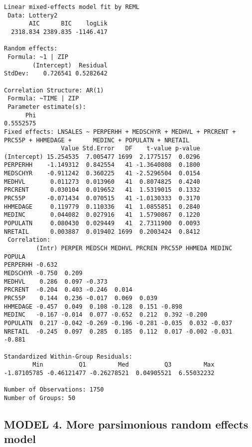 \documentclass[]{book}
\begin{document}
\begin{verbatim}
Linear mixed-effects model fit by REML
 Data: Lottery2 
       AIC      BIC    logLik
  2318.834 2389.835 -1146.417

Random effects:
 Formula: ~1 | ZIP
        (Intercept)  Residual
StdDev:    0.726541 0.5282642

Correlation Structure: AR(1)
 Formula: ~TIME | ZIP 
 Parameter estimate(s):
      Phi 
0.5552575 
Fixed effects: LNSALES ~ PERPERHH + MEDSCHYR + MEDHVL + PRCRENT + PRC55P + HHMEDAGE +      MEDINC + POPULATN + NRETAIL 
                Value Std.Error   DF    t-value p-value
(Intercept) 15.254535  7.005477 1699  2.1775157  0.0296
PERPERHH    -1.149312  0.842554   41 -1.3640808  0.1800
MEDSCHYR    -0.911242  0.360225   41 -2.5296504  0.0154
MEDHVL       0.011273  0.013960   41  0.8074825  0.4240
PRCRENT      0.030104  0.019652   41  1.5319015  0.1332
PRC55P      -0.071434  0.070515   41 -1.0130333  0.3170
HHMEDAGE     0.119779  0.110336   41  1.0855851  0.2840
MEDINC       0.044082  0.027916   41  1.5790867  0.1220
POPULATN     0.080430  0.029449   41  2.7311900  0.0093
NRETAIL      0.003887  0.019402 1699  0.2003424  0.8412
 Correlation: 
         (Intr) PERPER MEDSCH MEDHVL PRCREN PRC55P HHMEDA MEDINC POPULA
PERPERHH -0.632                                                        
MEDSCHYR -0.750  0.209                                                 
MEDHVL    0.286  0.097 -0.373                                          
PRCRENT  -0.204  0.403 -0.246  0.014                                   
PRC55P    0.144  0.236 -0.017  0.069  0.039                            
HHMEDAGE -0.457  0.049  0.108 -0.128  0.151 -0.898                     
MEDINC   -0.167 -0.014  0.077 -0.652  0.212  0.392 -0.200              
POPULATN  0.217 -0.042 -0.269 -0.196 -0.281 -0.035  0.032 -0.037       
NRETAIL  -0.245  0.097  0.285  0.185  0.112  0.017 -0.002 -0.031 -0.881

Standardized Within-Group Residuals:
        Min          Q1         Med          Q3         Max 
-1.87105785 -0.46121477 -0.26278521  0.04905521  6.55032232 

Number of Observations: 1750
Number of Groups: 50 
\end{verbatim}

\hypertarget{model-4.-more-parsimonious-random-effects-model}{%
\subsection{MODEL 4. More parsimonious random effects model}\label{model-4.-more-parsimonious-random-effects-model}}
\end{document}

